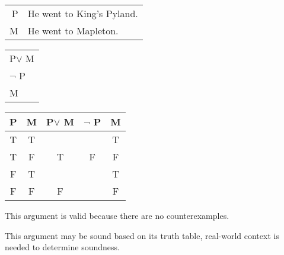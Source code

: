 \section{}
\centering
\begin{tabular}{r l}
    P & He went to King's Pyland. \\
    M & He went to Mapleton.
\end{tabular}
\begin{tabular}{l}
    P$\lor$ M\\
    $\lnot$ P\\
    \hline
    M
\end{tabular}

\begin{tabular}{c|c||c|c||c}
    P & M & P$\lor$ M & $\lnot$ P & M \\
    \hline
    T & T &   &   & T \\
    T & F & T & F & F \\
    F & T &   &   & T \\
    F & F & F &   & F
\end{tabular}

\justifying
\noindent This argument is valid because there are no counterexamples.

\noindent This argument may be sound based on its truth table, real-world context is needed to determine soundness.